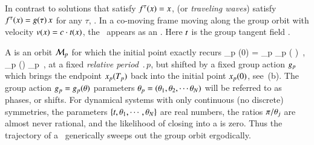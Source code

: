 \documentclass[final,number,sort&compress]{elsarticle}
\begin{document}
In contrast to \emph{\eqv} solutions that satisfy
$f^\tau(x)  =  x$, \emph{\reqva} (or \emph{traveling
waves}) satisfy $f^\tau(x) = g( \tau) \, x$ for
any $\tau$, .
In a co-moving frame moving along the group orbit
with velocity $v(x) = c \cdot t(x)$,
the \reqv\ appears as an \eqv. Here $t$ is the
group tangent field .

A {\em \rpo} is an orbit ${\cal M}_p$ for which the initial point
exactly recurs
\beq
\ssp_p (0) = \LieEl_p \ssp_p ( )
    \,,\qquad
\ssp_p (\tau) \in \pS_p
    \,,
\label{RPOrelper1}
\eeq
at a fixed {\em relative period} $\period{p}$, but shifted by
a fixed group action ${g_p}$ which brings the endpoint
$x_p ({T_{p}} ) $ back into the initial point $x_p
(0) $, see \,(b). The group action ${g_p}=
g_p({\bf \theta})$ parameters ${\bf \theta}_p =
({\bf \theta}_1,{\bf \theta}_2,\cdots{\bf \theta}_N)$ will be referred to as
phases, or shifts. For dynamical systems with only
continuous (no discrete) symmetries, the parameters
$\{t,{\bf \theta}_1,\cdots,{\bf \theta}_N\}$ are real numbers, the ratios
$\pi/{\bf \theta}_j$ are almost never rational, and the likelihood
of closing into a {\po} is {zero}. Thus the trajectory
of a \rpo\ generically sweeps out the group orbit ergodically.
\end{document}
